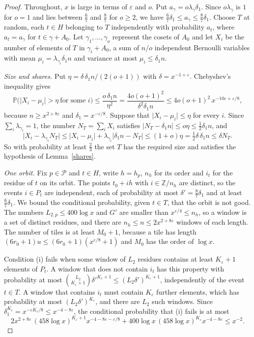 \begin{proof}
Throughout, $x$ is large in terms of $\varepsilon$ and $o$. Put $a_\gamma=o\lambda_\gamma\delta_1$. Since $o\lambda_\gamma$ is $1$ for $o=1$ and lies between $\frac67$ and $\frac87$ for $o\ge2$, we have $\frac67\delta_1\le a_\gamma\le\frac87\delta_1$. Choose $T$ at random, each $t\in H$ belonging to $T$ independently with probability $a_t$, where $a_t=a_\gamma$ for $t\in\gamma+A_0$. Let $\gamma_1,\dots,\gamma_o$ represent the cosets of $A_0$ and let $X_i$ be the number of elements of $T$ in $\gamma_i+A_0$, a sum of $n/o$ independent Bernoulli variables with mean $\mu_i=\lambda_{\gamma_i}\delta_1n$ and variance at most $\mu_i\le\delta_1n$.

\emph{Size and shares.} Put $\eta=\delta\,\delta_1n/(2(o+1))$ with $\delta=x^{-1+\varepsilon}$. Chebyshev's inequality gives
\[
\mathbb P\big(\lvert X_i-\mu_i\rvert>\eta\ \text{for some }i\big)\le\frac{o\,\delta_1n}{\eta^2}=\frac{4o(o+1)^2}{\delta^2\delta_1n}\le4o(o+1)^2\,x^{-10\varepsilon+\varepsilon/8},
\]
because $n\ge x^{2+8\varepsilon}$ and $\delta_1=x^{-\varepsilon/8}$. Suppose that $\lvert X_i-\mu_i\rvert\le\eta$ for every $i$. Since $\sum_i\lambda_{\gamma_i}=1$, the number $N_T=\sum_iX_i$ satisfies $\lvert N_T-\delta_1n\rvert\le o\eta\le\frac12\delta_1n$, and
\[
\lvert X_i-\lambda_{\gamma_i}N_T\rvert\le\lvert X_i-\mu_i\rvert+\lambda_{\gamma_i}\lvert\delta_1n-N_T\rvert\le(1+o)\eta=\tfrac12\delta\,\delta_1n\le\delta N_T .
\]
So with probability at least $\frac23$ the set $T$ has the required size and satisfies the hypothesis of Lemma~\ref{shares}.

\emph{One orbit.} Fix $p\in\mathcal P$ and $t\in H$, write $h=h_p$, $n_h$ for its order and $i_t$ for the residue of $t$ on its orbit. The points $t_0+ih$ with $i\in\mathbb Z/n_h$ are distinct, so the events $i\in P_t$ are independent, each of probability at most $\delta'=\frac87\delta_1$ and at least $\frac67\delta_1$. We bound the conditional probability, given $t\in T$, that the orbit is not good. The numbers $L_{2,p}\le400\log x$ and $G'$ are smaller than $x^{\varepsilon/4}\le n_h$, so a window is a set of distinct residues, and there are $n_h\le n\le2x^{2+8\varepsilon}$ windows of each length. The number of tiles is at least $M_0+1$, because a tile has length $(6r_0+1)u\le(6r_0+1)(x^{\varepsilon/8}+1)$ and $M_0$ has the order of $\log x$.

Condition (i) fails when some window of $L_2$ residues contains at least $K_\varepsilon+1$ elements of $P_t$. A window that does not contain $i_t$ has this property with probability at most $\binom{L_2}{K_\varepsilon+1}\delta'^{K_\varepsilon+1}\le(L_2\delta')^{K_\varepsilon+1}$, independently of the event $t\in T$. A window that contains $i_t$ must contain $K_\varepsilon$ further elements, which has probability at most $(L_2\delta')^{K_\varepsilon}$, and there are $L_2$ such windows. Since $\delta_1^{K_\varepsilon}=x^{-\varepsilon K_\varepsilon/8}\le x^{-4-8\varepsilon}$, the conditional probability that (i) fails is at most
\[
2x^{2+8\varepsilon}\,(458\log x)^{K_\varepsilon+1}x^{-4-8\varepsilon-\varepsilon/8}+400\log x\,(458\log x)^{K_\varepsilon}x^{-4-8\varepsilon}\le x^{-2}.
\]


\end{proof}
